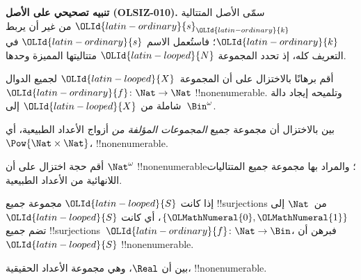 \documentclass[../../../include/open-logic-section]{subfiles}
\begin{document}
\begin{editorial}
\textbf{تنبيه تصحيحي على الأصل (OLSIZ-010).}
سمّى الأصل المتتالية $\OLId{latin-ordinary}{s}_\OLId{latin-ordinary}{k}$ من غير أن يربط $\OLId{latin-ordinary}{k}$؛ فاستُعمل الاسم
$\OLId{latin-ordinary}{s}$ في التعريف كله، إذ تحدد المجموعة $\OLId{latin-looped}{N}$ متتاليتها المميزة وحدها.
\end{editorial}


\begin{prob}\label{sfr:siz:red-alt:prob:nat-nat}
أقم برهانًا بالاختزال على أن المجموعة~$\OLId{latin-looped}{X}$ لجميع الدوال $\OLId{latin-ordinary}{f}\colon \Nat \to \Nat$ !!{nonenumerable}. وتلميحه إيجاد دالة شاملة من $\OLId{latin-looped}{X}$ إلى~$\Bin^\omega$.
\end{prob}

\begin{prob}
بين بالاختزال أن مجموعة جميع \emph{المجموعات المؤلفة من} أزواج الأعداد الطبيعية، أي $\Pow{\Nat \times \Nat}$، !!{nonenumerable}.
\end{prob}

\begin{prob}
أقم حجة اختزال على أن $\Nat^\omega$ !!{nonenumerable}؛ والمراد بها مجموعة جميع المتتاليات اللانهائية من الأعداد الطبيعية.
\end{prob}


\begin{prob}
إذا كانت $\OLId{latin-looped}{S}$ مجموعة جميع !!{surjection}s من~$\Nat$ إلى $\{\OLMathNumeral{0},\OLMathNumeral{1}\}$، أي كانت $\OLId{latin-looped}{S}$ تضم جميع !!{surjection}s~$\OLId{latin-ordinary}{f} \colon \Nat
\to \Bin$، فبرهن أن $\OLId{latin-looped}{S}$ !!{nonenumerable}.
\end{prob}

\begin{prob}
بين أن $\Real$، وهي مجموعة الأعداد الحقيقية، !!{nonenumerable}.
\end{prob}
\end{document}

